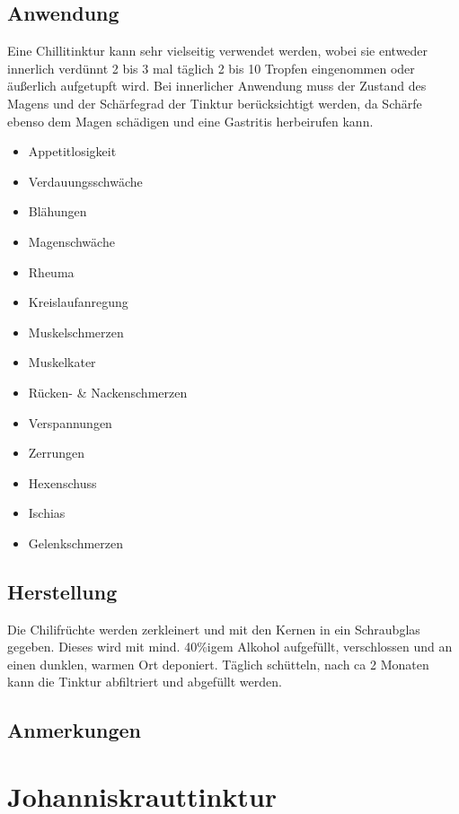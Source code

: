 \subsection{Anwendung}

Eine Chillitinktur kann sehr vielseitig verwendet werden, wobei sie entweder innerlich verdünnt 2 bis 3  mal täglich 2 bis 10 Tropfen eingenommen oder äußerlich aufgetupft wird. Bei innerlicher Anwendung muss der Zustand des Magens und der Schärfegrad der Tinktur berücksichtigt werden, da Schärfe ebenso dem Magen schädigen und eine Gastritis herbeirufen kann. 

\begin{itemize}
	\item Appetitlosigkeit
	\item Verdauungsschwäche
	\item Blähungen
	\item Magenschwäche
	\item Rheuma
	\item Kreislaufanregung
	\item Muskelschmerzen
	\item Muskelkater
	\item Rücken- \& Nackenschmerzen
	\item Verspannungen
	\item Zerrungen
	\item Hexenschuss
	\item Ischias
	\item Gelenkschmerzen
\end{itemize}

\subsection{Herstellung}

Die Chilifrüchte werden zerkleinert und mit den Kernen in ein Schraubglas gegeben. Dieses wird mit mind. 40\%igem Alkohol aufgefüllt, verschlossen und an einen dunklen, warmen Ort deponiert. Täglich schütteln, nach ca 2 Monaten kann die Tinktur abfiltriert und abgefüllt werden.

\subsection{Anmerkungen}






\section{Johanniskrauttinktur}

